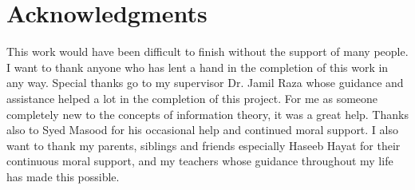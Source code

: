 \chapter*{Acknowledgments}

This work would have been difficult to finish without the support of many people. I want to thank anyone who has lent a hand in the completion of this work in any way. Special thanks go to my supervisor Dr. Jamil Raza whose guidance and assistance helped a lot in the completion of this project. For me as someone completely new to the concepts of information theory, it was a great help. Thanks also to Syed Masood for his occasional help and continued moral support. I also want to thank my parents, siblings and friends especially Haseeb Hayat for their continuous moral support, and my teachers whose guidance throughout my life has made this possible.

